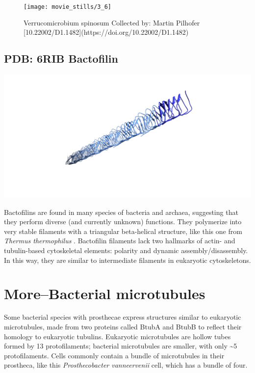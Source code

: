 \documentclass[]{tufte-book}
\begin{document}
\begin{figure}
\texttt{[image: movie\_stills/3\_6]} \caption[Verrucomicrobium spinosum Collected by]{Verrucomicrobium spinosum Collected by: Martin Pilhofer [10.22002/D1.1482](https://doi.org/10.22002/D1.1482)}\label{fig:unnamed-chunk-54}
\end{figure}

\subsection{PDB: 6RIB Bactofilin}\label{PDB:_6RIB_Bactofilin}

\includegraphics{img/schematics/3_6_1}

Bactofilins are found in many species of bacteria and archaea,
suggesting that they perform diverse (and currently unknown) functions.
They polymerize into very stable filaments with a triangular
beta-helical structure, like this one from \emph{Thermus thermophilus}
\citet{deng2019}. Bactofilin filaments lack two hallmarks of actin- and
tubulin-based cytoskeletal elements: polarity and dynamic
assembly/disassembly. In this way, they are similar to intermediate
filaments in eukaryotic cytoskeletons.

\hypertarget{morebacterial-microtubules}{\section{More--Bacterial
microtubules}\label{morebacterial-microtubules}}

Some bacterial species with prosthecae express structures similar to
eukaryotic microtubules, made from two proteins called BtubA and BtubB
to reflect their homology to eukaryotic tubulins. Eukaryotic
microtubules are hollow tubes formed by 13 protofilaments; bacterial
microtubules are smaller, with only \textasciitilde{}5 protofilaments.
Cells commonly contain a bundle of microtubules in their prostheca, like
this \emph{Prosthecobacter vanneervenii} cell, which has a bundle of
four.
\end{document}
